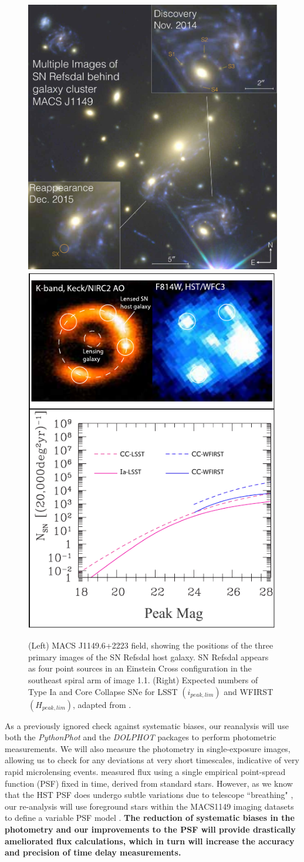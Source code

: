 \begin{figure}[h]
\centering
\includegraphics[width=.5\linewidth]{FIG/refsdal_summary2}
\includegraphics[width=.37\linewidth]{FIG/lensed3}
\caption{
(Left) MACS J1149.6+2223 field, showing the positions of the three primary
images of the SN Refsdal host galaxy. SN
Refsdal appears as four point sources in an Einstein Cross
configuration in the southeast spiral arm of image 1.1. (Right)
Expected numbers of Type Ia and Core Collapse SNe for LSST $(i_{peak,lim})$ and 
WFIRST $(H_{peak,lim})$, adapted from \citet{Oguri:2010a}.}
\end{figure}%

As a previously ignored check against systematic biases, our reanalysis will use both the \textit{PythonPhot} and the \textit{DOLPHOT} packages to 
perform photometric measurements. We will also measure the photometry in single-exposure images, allowing us to check for any deviations 
at very short timescales, indicative of very rapid microlensing events. \cite{Rodney:2016} measured flux using a single empirical 
point-spread function (PSF) fixed in time, derived from standard stars. However, as we know that the HST PSF does undergo 
subtle variations due to telescope ``breathing" \citep{Dressel:2012}, our re-analysis will use foreground stars within the MACS1149 imaging 
datasets to define a variable PSF model \citep{Cox:2011}. \textbf{The reduction of systematic biases in the photometry and our improvements to the 
PSF will provide drastically ameliorated flux calculations, which in turn will increase the accuracy and precision of time delay measurements.}

